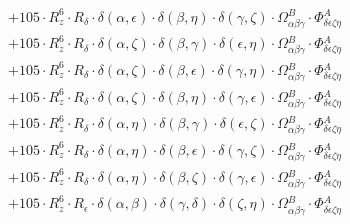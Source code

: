 \documentclass{article}
\begin{document}
\begin{equation}
\begin{array}{c}
 \\[0.2em] 		 + 105 \cdot R_{z}^{6} \cdot R_{\delta{}} \cdot \delta{}\left(\alpha{}, \epsilon{}\right) \cdot \delta{}\left(\beta{}, \eta{}\right) \cdot \delta{}\left(\gamma{}, \zeta{}\right) \cdot \Omega{}^{B}_{\alpha{}\beta{}\gamma{}} \cdot \Phi{}^{A}_{\delta{}\epsilon{}\zeta{}\eta{}} 
 \\[0.2em] 		 + 105 \cdot R_{z}^{6} \cdot R_{\delta{}} \cdot \delta{}\left(\alpha{}, \zeta{}\right) \cdot \delta{}\left(\beta{}, \gamma{}\right) \cdot \delta{}\left(\epsilon{}, \eta{}\right) \cdot \Omega{}^{B}_{\alpha{}\beta{}\gamma{}} \cdot \Phi{}^{A}_{\delta{}\epsilon{}\zeta{}\eta{}} 
 \\[0.2em] 		 + 105 \cdot R_{z}^{6} \cdot R_{\delta{}} \cdot \delta{}\left(\alpha{}, \zeta{}\right) \cdot \delta{}\left(\beta{}, \epsilon{}\right) \cdot \delta{}\left(\gamma{}, \eta{}\right) \cdot \Omega{}^{B}_{\alpha{}\beta{}\gamma{}} \cdot \Phi{}^{A}_{\delta{}\epsilon{}\zeta{}\eta{}} 
 \\[0.2em] 		 + 105 \cdot R_{z}^{6} \cdot R_{\delta{}} \cdot \delta{}\left(\alpha{}, \zeta{}\right) \cdot \delta{}\left(\beta{}, \eta{}\right) \cdot \delta{}\left(\gamma{}, \epsilon{}\right) \cdot \Omega{}^{B}_{\alpha{}\beta{}\gamma{}} \cdot \Phi{}^{A}_{\delta{}\epsilon{}\zeta{}\eta{}} 
 \\[0.2em] 		 + 105 \cdot R_{z}^{6} \cdot R_{\delta{}} \cdot \delta{}\left(\alpha{}, \eta{}\right) \cdot \delta{}\left(\beta{}, \gamma{}\right) \cdot \delta{}\left(\epsilon{}, \zeta{}\right) \cdot \Omega{}^{B}_{\alpha{}\beta{}\gamma{}} \cdot \Phi{}^{A}_{\delta{}\epsilon{}\zeta{}\eta{}} 
 \\[0.2em] 		 + 105 \cdot R_{z}^{6} \cdot R_{\delta{}} \cdot \delta{}\left(\alpha{}, \eta{}\right) \cdot \delta{}\left(\beta{}, \epsilon{}\right) \cdot \delta{}\left(\gamma{}, \zeta{}\right) \cdot \Omega{}^{B}_{\alpha{}\beta{}\gamma{}} \cdot \Phi{}^{A}_{\delta{}\epsilon{}\zeta{}\eta{}} 
 \\[0.2em] 		 + 105 \cdot R_{z}^{6} \cdot R_{\delta{}} \cdot \delta{}\left(\alpha{}, \eta{}\right) \cdot \delta{}\left(\beta{}, \zeta{}\right) \cdot \delta{}\left(\gamma{}, \epsilon{}\right) \cdot \Omega{}^{B}_{\alpha{}\beta{}\gamma{}} \cdot \Phi{}^{A}_{\delta{}\epsilon{}\zeta{}\eta{}} 
 \\[0.2em] 		 + 105 \cdot R_{z}^{6} \cdot R_{\epsilon{}} \cdot \delta{}\left(\alpha{}, \beta{}\right) \cdot \delta{}\left(\gamma{}, \delta{}\right) \cdot \delta{}\left(\zeta{}, \eta{}\right) \cdot \Omega{}^{B}_{\alpha{}\beta{}\gamma{}} \cdot \Phi{}^{A}_{\delta{}\epsilon{}\zeta{}\eta{}} 

\end{array}
\end{equation}
\end{document}
